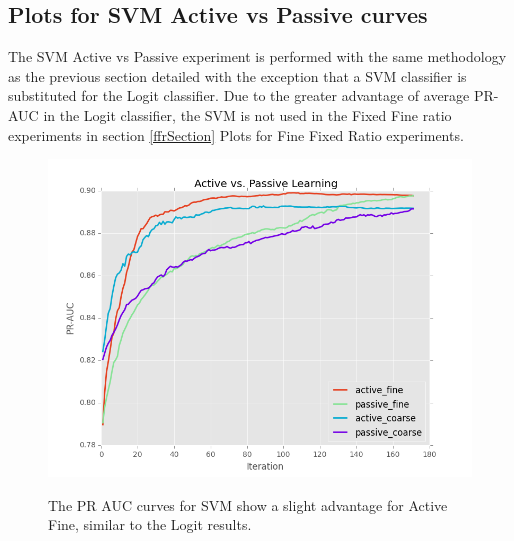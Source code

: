 \documentclass[ms]{nuthesis}
\begin{document}
\clearpage

\subsection{Plots for SVM Active vs Passive curves}
\par The SVM Active vs Passive experiment is performed with the same methodology
as the previous section detailed with the exception that a SVM classifier is
substituted for the Logit classifier. Due to the greater advantage of average
PR-AUC in the Logit classifier, the SVM is not used in the Fixed Fine ratio
experiments in section \ref{ffrSection} Plots for Fine Fixed Ratio experiments.

\FloatBarrier
\begin{figure}[!htb]
	\centering
    \includegraphics[width=1.0\columnwidth]{fig/runActPassSVM_pr}
    \label{fig:ActiveVsPassivePRSVM}
    \caption{The PR AUC curves for SVM show a slight advantage for Active Fine,
     similar to the Logit results.}
\end{figure}
\FloatBarrier
\end{document}

